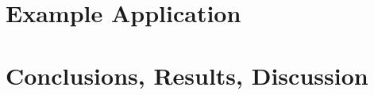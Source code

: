 \documentclass[]{rptuseminar}
\begin{document}
\section{Example Application}
\label{sec:example}

\section{Conclusions, Results, Discussion}
\label{sec:conclusions}

\newpage
\nocite{*}



\end{document}

